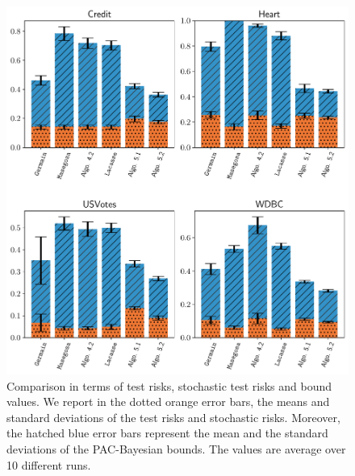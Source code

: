 \begin{figure}
    \centering
    \includegraphics[width=1.0\linewidth]{chapter_5/figures/stump_binary_1.pdf}
    \caption[Comparison of the Risks and the Bound Values (1/4)]{
    Comparison in terms of test risks, stochastic test risks and bound values. 
    We report in the dotted orange error bars, the means and standard deviations of the test risks and stochastic risks.
    Moreover, the hatched blue error bars represent the mean and the standard deviations of the PAC-Bayesian bounds.
    The values are average over 10 different runs.
    }
    \label{chap:mv-sto:fig:stump-binary-1}
\end{figure}

